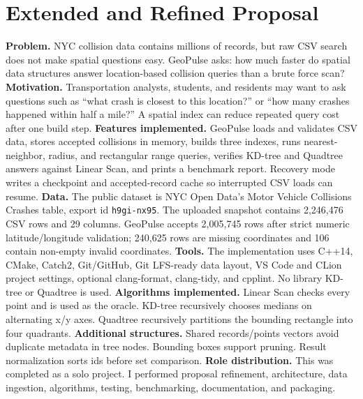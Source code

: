 \documentclass[12pt]{article}
\begin{document}
\section{Extended and Refined Proposal}
\textbf{Problem.} NYC collision data contains millions of records, but raw CSV
search does not make spatial questions easy. GeoPulse asks: how much faster do
spatial data structures answer location-based collision queries than a brute
force scan?\newline
\textbf{Motivation.} Transportation analysts, students, and residents may want
to ask questions such as ``what crash is closest to this location?'' or ``how
many crashes happened within half a mile?'' A spatial index can reduce repeated
query cost after one build step.\newline
\textbf{Features implemented.} GeoPulse loads and validates CSV data, stores
accepted collisions in memory, builds three indexes, runs nearest-neighbor,
radius, and rectangular range queries, verifies KD-tree and Quadtree answers
against Linear Scan, and prints a benchmark report. Recovery mode writes a
checkpoint and accepted-record cache so interrupted CSV loads can resume.\newline
\textbf{Data.} The public dataset is NYC Open Data's Motor Vehicle Collisions
Crashes table, export id \texttt{h9gi-nx95}. The uploaded snapshot contains
2,246,476 CSV rows and 29 columns. GeoPulse accepts 2,005,745 rows after strict
numeric latitude/longitude validation; 240,625 rows are missing coordinates and
106 contain non-empty invalid coordinates.\newline
\textbf{Tools.} The implementation uses C++14, CMake, Catch2, Git/GitHub,
Git LFS-ready data layout, VS Code and CLion project settings, optional
clang-format, clang-tidy, and cpplint. No library KD-tree or Quadtree is used.\newline
\textbf{Algorithms implemented.} Linear Scan checks every point and is used as
the oracle. KD-tree recursively chooses medians on alternating x/y axes. Quadtree
recursively partitions the bounding rectangle into four quadrants.\newline
\textbf{Additional structures.} Shared records/points vectors avoid duplicate
metadata in tree nodes. Bounding boxes support pruning. Result normalization
sorts ids before set comparison.\newline
\textbf{Role distribution.} This was completed as a solo project. I performed
proposal refinement, architecture, data ingestion, algorithms, testing,
benchmarking, documentation, and packaging.
\end{document}
